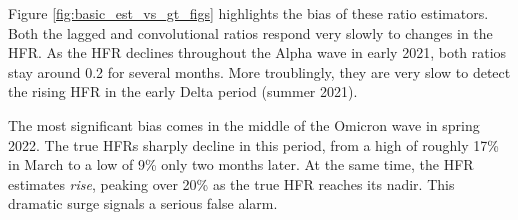 \documentclass{article}
\begin{document}
Figure \ref{fig:basic_est_vs_gt_figs} highlights the bias of these ratio estimators. Both the lagged and convolutional ratios respond very slowly to changes in the HFR. As the HFR declines throughout the Alpha wave in early 2021, both ratios stay around 0.2 for several months. More troublingly, they are very slow to detect the rising HFR in the early Delta period (summer 2021). %

The most significant bias comes in the middle of the Omicron wave in spring 2022. The true HFRs sharply decline in this period, from a high of roughly 17\% in March to a low of 9\% only two months later. At the same time, the HFR estimates \textit{rise}, peaking over 20\% as the true HFR reaches its nadir. This dramatic surge signals a serious false alarm. 
\end{document}
